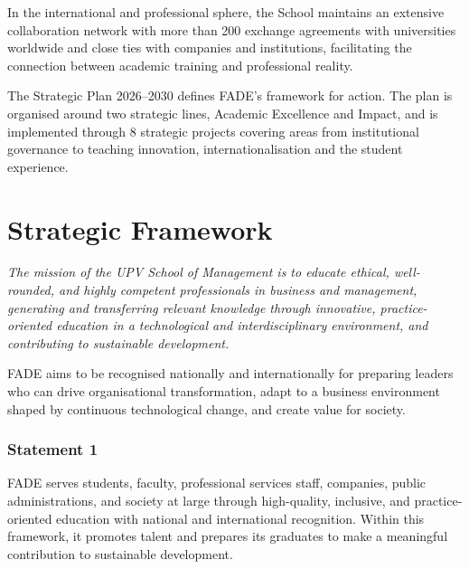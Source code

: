 \documentclass[11pt,a4paper]{scrreprt}
\begin{document}
In the international and professional sphere, the School maintains an extensive collaboration network with more than 200 exchange agreements with universities worldwide and close ties with companies and institutions, facilitating the connection between academic training and professional reality.

\begin{tcolorbox}[highlightbox]
The Strategic Plan 2026--2030 defines FADE's framework for action. The plan is organised around two strategic lines, Academic Excellence and Impact, and is implemented through 8 strategic projects covering areas from institutional governance to teaching innovation, internationalisation and the student experience.
\end{tcolorbox}

\clearpage
\chapter*{Strategic Framework}

\begin{tcolorbox}[descbox]
\small\itshape The mission of the UPV School of Management is to educate ethical, well-rounded, and highly competent professionals in business and management, generating and transferring relevant knowledge through innovative, practice-oriented education in a technological and interdisciplinary environment, and contributing to sustainable development.
\end{tcolorbox}

\begin{tcolorbox}[fieldbox]
\small FADE aims to be recognised nationally and internationally for preparing leaders who can drive organisational transformation, adapt to a business environment shaped by continuous technological change, and create value for society.
\end{tcolorbox}

\subsection*{Statement 1}
\small FADE serves students, faculty, professional services staff, companies, public administrations, and society at large through high-quality, inclusive, and practice-oriented education with national and international recognition. Within this framework, it promotes talent and prepares its graduates to make a meaningful contribution to sustainable development.
\end{document}
